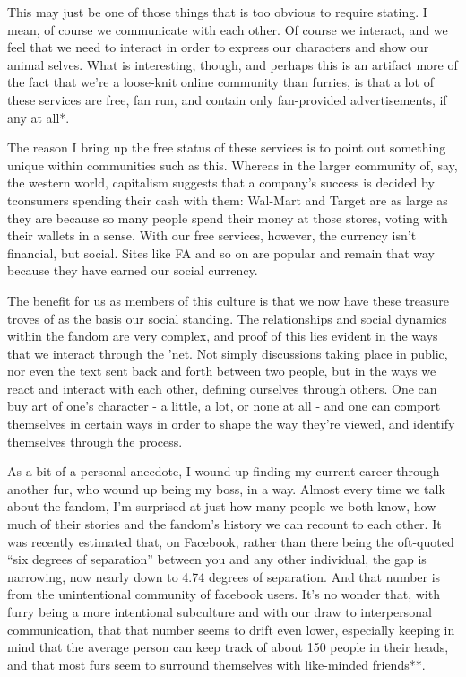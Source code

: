 This may just be one of those things that is too obvious to require stating. I mean, of course we communicate with each other. Of course we interact, and we feel that we need to interact in order to express our characters and show our animal selves. What is interesting, though, and perhaps this is an artifact more of the fact that we're a loose-knit online community than furries, is that a lot of these services are free, fan run, and contain only fan-provided advertisements, if any at all*.

The reason I bring up the free status of these services is to point out something unique within communities such as this. Whereas in the larger community of, say, the western world, capitalism suggests that a company's success is decided by tconsumers spending their cash with them: Wal-Mart and Target are as large as they are because so many people spend their money at those stores, voting with their wallets in a sense. With our free services, however, the currency isn't financial, but social. Sites like FA and so on are popular and remain that way because they have earned our social currency.

The benefit for us as members of this culture is that we now have these treasure troves of as the basis our social standing. The relationships and social dynamics within the fandom are very complex, and proof of this lies evident in the ways that we interact through the 'net. Not simply discussions taking place in public, nor even the text sent back and forth between two people, but in the ways we react and interact with each other, defining ourselves through others. One can buy art of one's character - a little, a lot, or none at all - and one can comport themselves in certain ways in order to shape the way they're viewed, and identify themselves through the process.

As a bit of a personal anecdote, I wound up finding my current career through another fur, who wound up being my boss, in a way. Almost every time we talk about the fandom, I'm surprised at just how many people we both know, how much of their stories and the fandom's history we can recount to each other. It was recently estimated that, on Facebook, rather than there being the oft-quoted ``six degrees of separation'' between you and any other individual, the gap is narrowing, now nearly down to 4.74 degrees of separation. And that number is from the unintentional community of facebook users. It's no wonder that, with furry being a more intentional subculture and with our draw to interpersonal communication, that that number seems to drift even lower, especially keeping in mind that the average person can keep track of about 150 people in their heads, and that most furs seem to surround themselves with like-minded friends**.

